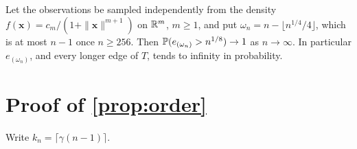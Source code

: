 \begin{counterexample}\label{cex:fattails}
  Let the observations be sampled independently from the density $f(\bm{x})=c_m/(1+\|\bm{x}\|^{m+1})$ on $\R^m$, $m\ge1$, and put $\omega_n=n-\lfloor n^{1/4}/4\rfloor$, which is at most $n-1$ once $n\ge256$. Then $\P(e_{(\omega_n)}>n^{1/8})\to1$ as $n\to\infty$. In particular $e_{(\omega_n)}$, and every longer edge of $T$, tends to infinity in probability.
\end{counterexample}

\section{Proof of \texorpdfstring{\cref{prop:order}}{Proposition 1}}

Write $k_n=\lceil\gamma(n-1)\rceil$.


